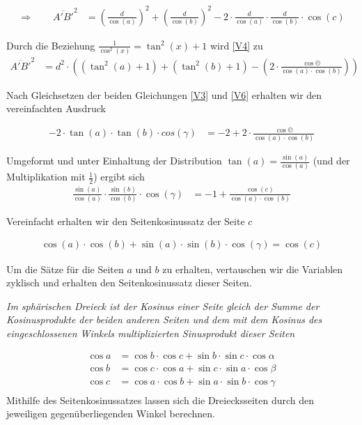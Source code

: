 \begin{refsection}
\begin{align}
\Rightarrow \quad \quad
\overline{A'B'}^{ 2 } &= \left(\frac{ d }{\cos(a) }  \right)^{ 2 } + \left(\frac{ d }{\cos(b)}  \right)^{ 2 } - 2 \cdot \frac{ d }{\cos(a)} \cdot \frac{ d }{\cos(b)} \cdot \cos(c) 
\label{V4}
\end{align}

Durch die Beziehung $\frac{1}{\cos^{2}(x)}=\tan^{2}(x)+1$ wird \eqref{V4} zu 
\begin{align}
\overline{ A'B'}^{ 2 } &= d^{ 2 } \cdot \left(\left(\tan^{ 2 }(a) + 1\right) + \left(\tan^{ 2 }(b) + 1\right) - \left(2 \cdot \frac{\cos©}{\cos(a) \cdot \cos(b)}\right)\right)
\label {V6}
\end{align}

Nach Gleichsetzen der beiden Gleichungen \eqref{V3} und \eqref{V6} erhalten wir den vereinfachten Ausdruck 

\begin{align*}
-2 \cdot \tan(a) \cdot \tan(b) \cdot cos(\gamma) &= -2+2 \cdot \frac{\cos©}{\cos(a) \cdot \cos(b)}
\end{align*}


Umgeformt und unter Einhaltung der Distribution $\tan(a)=\frac{\sin(a)}{\cos(a)}$ (und der Multiplikation mit $\frac{1}{2}$) ergibt sich
\begin{align*}
\frac{\sin(a)}{\cos(a)} \cdot \frac{\sin(b)}{\cos(b)} \cdot \cos(\gamma) &= -1 + \frac{\cos(c)}{\cos(a) \cdot \cos(b)}
\end{align*}

Vereinfacht erhalten wir den Seitenkosinussatz der Seite $c$

\begin{align*}
\cos(a) \cdot \cos(b) + \sin(a) \cdot \sin(b) \cdot \cos(\gamma) = \cos(c)
\end{align*}

Um die Sätze für die Seiten $a$ und $b$ zu erhalten, vertauschen wir die Variablen zyklisch und erhalten den Seitenkosinussatz dieser Seiten.

\begin{satz}\textit{Im sphärischen Dreieck ist der Kosinus einer Seite gleich der Summe der Kosinusprodukte der beiden anderen Seiten und dem mit dem Kosinus des eingeschlossenen Winkels multiplizierten Sinusprodukt dieser Seiten}
\label{skript:kugel:satz:Seitenkosinussatz}
\end{satz}
\begin{align*}
{\cos a} &= {\cos b} \cdot {\cos c} + {\sin b} \cdot {\sin c} \cdot {\cos \alpha}\\
{\cos b} &= {\cos c} \cdot {\cos a} + {\sin c} \cdot {\sin a} \cdot {\cos \beta}\\
{\cos c} &= {\cos a} \cdot {\cos b} + {\sin a} \cdot {\sin b} \cdot {\cos \gamma}\\
\end{align*}
Mithilfe des Seitenkosinussatzes lassen sich die Dreiecksseiten durch den jeweiligen gegenüberliegenden Winkel berechnen.



\end{refsection}
